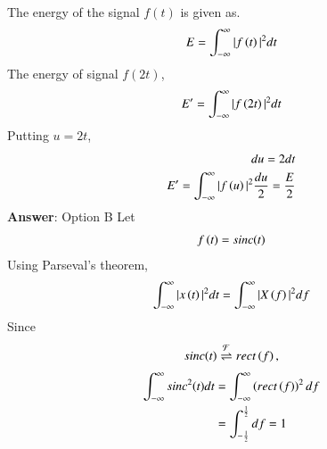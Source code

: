 
The energy of the signal $f(t)$ is given as.
\begin{align}
    E = \int_{-\infty}^{\infty} |f\left(t\right)|^2 dt
\end{align}
The energy of signal $f(2t)$,
\begin{align}
    E' = \int_{-\infty}^{\infty} |f\left(2t\right)|^2 dt
\end{align}
Putting $u = 2t$,
\begin{align}
    du = 2dt\\
    E' = \int_{-\infty}^{\infty} |f\left(u\right)|^2 \frac{du}{2} = \frac{E}{2}
\end{align}
\textbf{Answer}: Option B
Let 
\begin{align}
    f\left(t\right) = sinc{\left(t\right)}\\
\end{align}
Using 
Parseval's theorem, 
\begin{align}
    \int_{-\infty}^{\infty} |x\left(t\right)|^{2} dt = \int_{-\infty}^{\infty} |X\left(f\right)|^{2} df
\end{align}
Since \begin{align}
    sinc{\left(t\right)} \overset{\mathcal{F}}{ \rightleftharpoons} rect\left(f\right),
\end{align}
\begin{align}
     \int_{-\infty}^{\infty} sinc^2{\left(t\right)}  dt &= \int_{-\infty}^{\infty} \left(rect\left(f\right)\right)^2  df \\
     &= \int_{-\frac{1}{2}}^{\frac{1}{2}} df = 1
\end{align}
